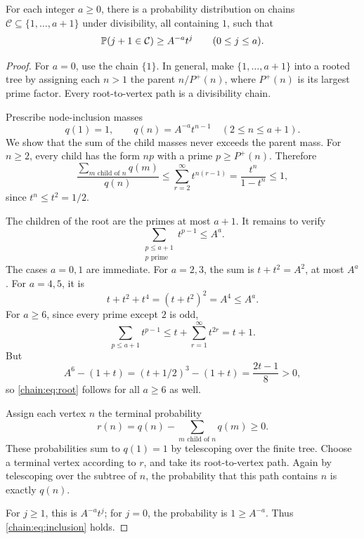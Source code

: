 \begin{lemma}\label{chain:lem:chains}
For each integer $a\ge0$, there is a probability distribution on chains $\mathcal C\subseteq\{1,\ldots,a+1\}$ under divisibility, all containing $1$, such that
\begin{equation}\label{chain:eq:inclusion}
\mathbb P(j+1\in\mathcal C)\ge A^{-a}t^j
\qquad(0\le j\le a).
\end{equation}
\end{lemma}
\begin{proof}
For $a=0$, use the chain $\{1\}$. In general, make $\{1,\ldots,a+1\}$ into a rooted tree by assigning each $n>1$ the parent $n/P^+(n)$, where $P^+(n)$ is its largest prime factor. Every root-to-vertex path is a divisibility chain.

Prescribe node-inclusion masses
\[
q(1)=1,\qquad q(n)=A^{-a}t^{n-1}\quad(2\le n\le a+1).
\]
We show that the sum of the child masses never exceeds the parent mass.
For $n\ge2$, every child has the form $np$ with a prime $p\ge P^+(n)$. Therefore
\[
\frac{\sum_{m\text{ child of }n}q(m)}{q(n)}
\le\sum_{r=2}^{\infty}t^{n(r-1)}
=\frac{t^n}{1-t^n}\le1,
\]
since $t^n\le t^2=1/2$.

The children of the root are the primes at most $a+1$. It remains to verify
\begin{equation}\label{chain:eq:root}
\sum_{\substack{p\le a+1\\p\text{ prime}}}t^{p-1}\le A^a.
\end{equation}
The cases $a=0,1$ are immediate. For $a=2,3$, the sum is $t+t^2=A^2$, at most $A^a$. For $a=4,5$, it is
\[
t+t^2+t^4=(t+t^2)^2=A^4\le A^a.
\]
For $a\ge6$, since every prime except $2$ is odd,
\[
\sum_{p\le a+1}t^{p-1}
\le t+\sum_{r=1}^{\infty}t^{2r}
=t+1.
\]
But
\[
A^6-(1+t)=(t+1/2)^3-(1+t)=\frac{2t-1}{8}>0,
\]
so \eqref{chain:eq:root} follows for all $a\ge6$ as well.

Assign each vertex $n$ the terminal probability
\[
r(n)=q(n)-\sum_{m\text{ child of }n}q(m)\ge0.
\]
These probabilities sum to $q(1)=1$ by telescoping over the finite tree. Choose a terminal vertex according to $r$, and take its root-to-vertex path. Again by telescoping over the subtree of $n$, the probability that this path contains $n$ is exactly $q(n)$.

For $j\ge1$, this is $A^{-a}t^j$; for $j=0$, the probability is $1\ge A^{-a}$. Thus \eqref{chain:eq:inclusion} holds.
\end{proof}


